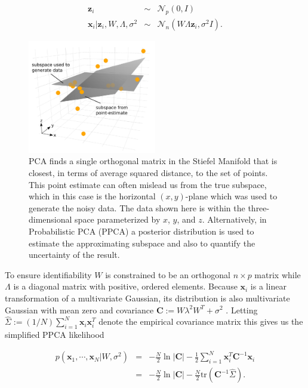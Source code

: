 \documentclass[ba]{imsart}
\newcommand{\mb}[1]{\mathbf{#1}}
\numberwithin{equation}{section}
\theoremstyle{plain}
\begin{document}
\begin{eqnarray}
\label{eq:PpcaGenerativeProcess}
\mb{z}_i &\sim& \mathcal{N}_p(0, I) \nonumber\\
\mb{x}_i | \mb{z}_i, W, \Lambda, \sigma^2 &\sim& \mathcal{N}_n(W \Lambda \mb{z}_i, \sigma^2 I).
\end{eqnarray}

\begin{figure}[h]
\centering
\vspace{.1in}
\includegraphics[width=0.5\textwidth]{figures/uncertainty_atz.pdf}
\vspace{.05in}
\caption{PCA finds a single orthogonal matrix in the Stiefel Manifold that is closest, in terms of average squared distance, to the set of points.  This point estimate can often mislead us from the true subspace, which in this case is the horizontal $(x,y)$-plane which was used to generate the noisy data. The data shown here is within the three-dimensional space parameterized by $x$, $y$, and $z$.  Alternatively, in Probabilistic PCA (PPCA) a posterior distribution is used to estimate the approximating subspace and also to quantify the uncertainty of the result.}
\label{fig:MleSubspaceEstimate}
\end{figure}

\noindent To ensure identifiability $W$ is constrained to be an orthogonal $n \times p$ matrix while $\Lambda$ is a diagonal matrix with positive, ordered elements. Because $\mb{x}_i$ is a linear transformation of a multivariate Gaussian, its distribution is also multivariate Gaussian with mean zero and covariance $\textbf{C} := W \lambda^2 W^T + \sigma^2$ \citep{murphy2012machine}. Letting $\hat{\Sigma} := (1/N) \sum_{i=1}^N \mb{x}_i \mb{x}_i^T$ denote the empirical covariance matrix this gives us the simplified PPCA likelihood

\begin{eqnarray}
p(\mb{x}_1, \cdots, \mb{x}_N | W, \sigma^2) &=& -\frac{N}{2} \ln |\textbf{C}| - \frac{1}{2} \sum_{i=1}^N \mb{x}_i^T \textbf{C}^{-1} \mb{x}_i\\
&=& -\frac{N}{2} \ln |\textbf{C}| - \frac{N}{2} \mathrm{tr} (\textbf{C}^{-1} \hat{\Sigma}).
\label{eq:ppca_likelihood}
\end{eqnarray}
\end{document}
